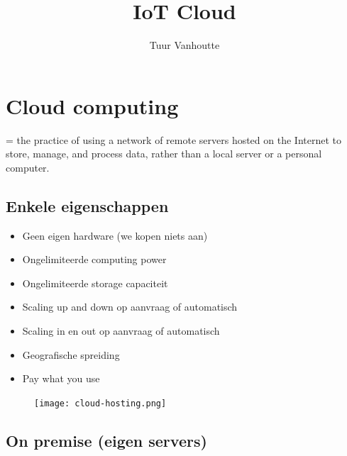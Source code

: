 \documentclass{article}
\begin{document}
\begin{titlepage}
    \author{Tuur Vanhoutte}
    \title{IoT Cloud}
\end{titlepage}

\maketitle
\newpage
\tableofcontents
\newpage


\section{Cloud computing}

= the practice of using a network of remote servers hosted on the Internet to store, manage, and process data, rather than a local server or a personal computer.

\subsection{Enkele eigenschappen}
\begin{itemize}
    \item Geen eigen hardware (we kopen niets aan)
    \item Ongelimiteerde computing power
    \item Ongelimiteerde storage capaciteit
    \item Scaling up and down op aanvraag of automatisch
    \item Scaling in en out op aanvraag of automatisch
    \item Geografische spreiding
    \item Pay what you use
\end{itemize}

\begin{figure}[H]
    \centering
    \texttt{[image: cloud-hosting.png]}
    \caption{}
\end{figure}


\subsection{On premise (eigen servers)}
\end{document}
